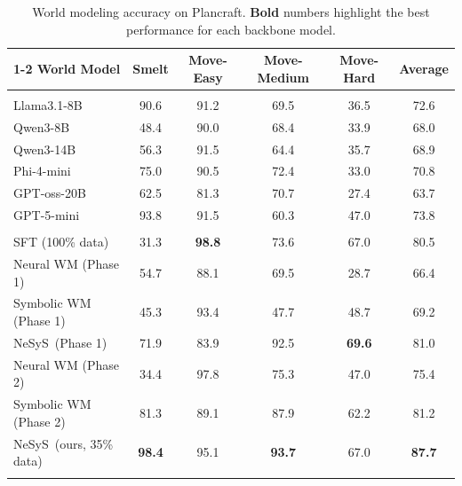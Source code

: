 \documentclass{article}
\theoremstyle{plain}
\theoremstyle{definition}
\theoremstyle{remark}
\newcommand{\ours}{{\sc NeSyS}\xspace}
\begin{document}
\begin{table}[ht]
  \caption{
  World modeling accuracy on Plancraft. \textbf{Bold} numbers highlight the best performance for each backbone model.
  }
  \label{tab:wm_plan_craft}
  \centering
  \begin{tabular}{lccccc}
    \toprule
    \cmidrule(r){1-2}
    World Model & Smelt & Move-Easy & Move-Medium & Move-Hard & Average\\
    \midrule
    \rowcolor{gray!15}
    \multicolumn{6}{c}{\bf Baseline Models} \\
    \midrule
    Llama3.1-8B & 90.6 & 91.2 & 69.5 & 36.5 & 72.6\\
    Qwen3-8B & 48.4 & 90.0 & 68.4 & 33.9 & 68.0\\
    Qwen3-14B & 56.3 & 91.5 & 64.4 & 35.7 & 68.9\\
    Phi-4-mini & 75.0 & 90.5 & 72.4 & 33.0 & 70.8\\
    GPT-oss-20B &62.5 & 81.3 & 70.7 & 27.4 & 63.7\\
    GPT-5-mini & 93.8 & 91.5 & 60.3 & 47.0 & 73.8 \\
    \midrule
    \rowcolor{gray!15}
    \multicolumn{6}{c}{\bf Llama3.2-1B} \\
    \midrule
    SFT (100\% data) & 31.3 & \textbf{98.8} & 73.6 & 67.0 & 80.5 \\
    \midrule
    Neural WM (Phase 1) & 54.7 & 88.1 & 69.5 & 28.7 & 66.4 \\
    Symbolic WM (Phase 1) & 45.3 & 93.4 & 47.7 & 48.7 & 69.2 \\
    \ours\ (Phase 1) & 71.9 & 83.9 & 92.5 & \textbf{69.6} & 81.0 \\
    \midrule
    Neural WM (Phase 2) & 34.4 & 97.8 & 75.3 & 47.0 & 75.4 \\
    Symbolic WM (Phase 2) & 81.3 & 89.1 & 87.9 & 62.2 & 81.2 \\
    \ours~(ours, 35\% data) & \textbf{98.4} & 95.1 & \textbf{93.7} & 67.0 & \textbf{87.7} \\
    \midrule
    \rowcolor{gray!15}
    \multicolumn{6}{c}{\bf Qwen3-4B} \\

\end{tabular}
\end{table}
\end{document}
